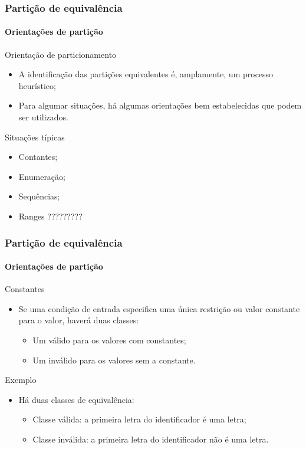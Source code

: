 \begin{frame}
\frametitle{Partição de equivalência}
\framesubtitle{Orientações de partição}

\begin{block:fact}{Orientação de particionamento}
\begin{itemize}
	\item A identificação das partições equivalentes é, amplamente, um
	processo heurístico;

	\item Para algumar situações, há algumas orientações bem estabelecidas
	que podem ser utilizados.
\end{itemize}
\end{block:fact}

\begin{block:fact}{Situações típicas}
\begin{itemize}
	\item Contantes;
	\item Enumeração;
	\item Sequências;
	\item Ranges ?????????
\end{itemize}
\end{block:fact}
\end{frame}


\begin{frame}
\frametitle{Partição de equivalência}
\framesubtitle{Orientações de partição}

\begin{block:fact}{Constantes}
\begin{itemize}
	\item Se uma condição de entrada especifica uma única restrição ou valor
	constante para o valor, haverá duas classes:
	\begin{itemize}
		\item Um válido para os valores com constantes;
		\item Um inválido para os valores sem a constante.
	\end{itemize}
\end{itemize}
\end{block:fact}

\begin{block}{Exemplo}
\begin{itemize}
	\itemO requisito afirma que ``o primeiro caracter do identificador
	deve ser uma letra'';

	\item Há duas classes de equivalência:
	\begin{itemize}
		\item Classe válida: a primeira letra do identificador é uma letra;
		\item Classe inválida: a primeira letra do identificador não é uma letra.
	\end{itemize}
\end{itemize}
\end{block}
\end{frame}



